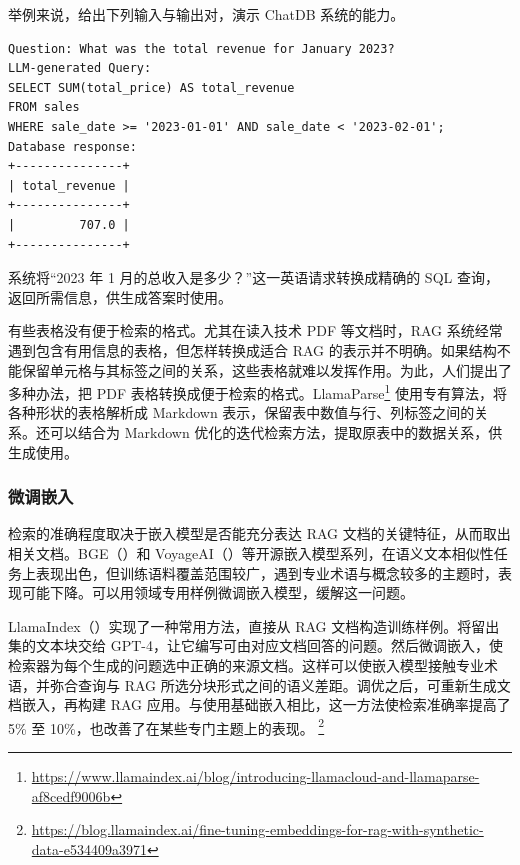 举例来说，给出下列输入与输出对，演示 ChatDB 系统的能力。

\begin{lstlisting}[nolol=true]
Question: What was the total revenue for January 2023?
LLM-generated Query:
SELECT SUM(total_price) AS total_revenue
FROM sales
WHERE sale_date >= '2023-01-01' AND sale_date < '2023-02-01';
Database response:
+---------------+
| total_revenue |
+---------------+
|         707.0 |
+---------------+
\end{lstlisting}

系统将“2023 年 1 月的总收入是多少？”这一英语请求转换成精确的 SQL 查询，返回所需信息，供生成答案时使用。

\begin{practicaltip}
有些表格没有便于检索的格式。尤其在读入技术 PDF 等文档时，RAG 系统经常遇到包含有用信息的表格，但怎样转换成适合 RAG 的表示并不明确。如果结构不能保留单元格与其标签之间的关系，这些表格就难以发挥作用。为此，人们提出了多种办法，把 PDF 表格转换成便于检索的格式。LlamaParse\footnote{\url{https://www.llamaindex.ai/blog/introducing-llamacloud-and-llamaparse-af8cedf9006b}} 使用专有算法，将各种形状的表格解析成 Markdown 表示，保留表中数值与行、列标签之间的关系。还可以结合为 Markdown 优化的迭代检索方法，提取原表中的数据关系，供生成使用。
\end{practicaltip}

\subsubsection{微调嵌入}
\label{sec:ch07-embedding-ft}
检索的准确程度取决于嵌入模型是否能充分表达 RAG 文档的关键特征，从而取出相关文档。BGE（）和 VoyageAI（）等开源嵌入模型系列，在语义文本相似性任务上表现出色，但训练语料覆盖范围较广，遇到专业术语与概念较多的主题时，表现可能下降。可以用领域专用样例微调嵌入模型，缓解这一问题。

LlamaIndex（）实现了一种常用方法，直接从 RAG 文档构造训练样例。将留出集的文本块交给 GPT-4，让它编写可由对应文档回答的问题。然后微调嵌入，使检索器为每个生成的问题选中正确的来源文档。这样可以使嵌入模型接触专业术语，并弥合查询与 RAG 所选分块形式之间的语义差距。调优之后，可重新生成文档嵌入，再构建 RAG 应用。与使用基础嵌入相比，这一方法使检索准确率提高了 5\% 至 10\%，也改善了在某些专门主题上的表现。%
\footnote{\url{https://blog.llamaindex.ai/fine-tuning-embeddings-for-rag-with-synthetic-data-e534409a3971}}

